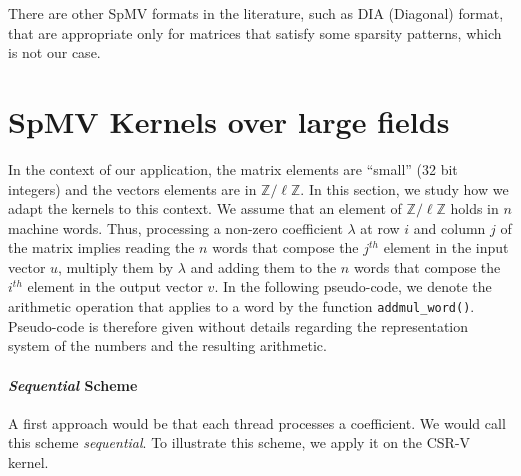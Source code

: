\documentclass[runningheads,orivec]{llncs}
\begin{document}
\medskip
There are other SpMV formats in the literature, such as DIA (Diagonal) format, that are appropriate only for matrices that satisfy some sparsity patterns, which is not our case.

\vspace*{-0.25cm}
\section{SpMV Kernels over large fields}
\label{sec::adaptation large integers}

In the context of our application, the matrix elements are ``small'' (32 bit integers) and the vectors elements are in $\mathbb{Z}/\ell\mathbb{Z}$. In this section, we study how we adapt the kernels to this context. We assume that an element of $\mathbb{Z}/\ell\mathbb{Z}$ holds in $n$ machine words. Thus, processing a non-zero coefficient $\lambda$ at row $i$ and column $j$ of the matrix implies reading the $n$ words that compose the $j^{th}$ element in the input vector $u$, multiply them by $\lambda$ and adding them to the $n$ words that compose the $i^{th}$ element in the output vector $v$. In the following pseudo-code, we denote the arithmetic operation that applies to a word by the function \texttt{addmul\_word()}. Pseudo-code is therefore given without details regarding the representation system of the numbers and the resulting arithmetic.

\vspace*{-0.25cm}
\paragraph{\bf \textit{Sequential} Scheme}

A first approach would be that each thread processes a coefficient. We would call this scheme \textit{sequential}. To illustrate this scheme, we apply it on the CSR-V kernel.
\end{document}
